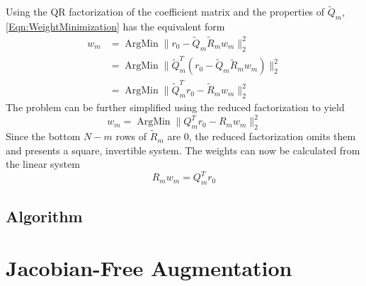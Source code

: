 \documentclass[Prelim,12pt]{WisconsinThesis}
\DeclareMathOperator*{\ArgMin}{ArgMin}
\begin{document}
Using the QR factorization of the coefficient matrix and the properties of $\widetilde{Q}_m$, \cref{Eqn:WeightMinimization} has the equivalent form
\begin{align*}
    w_m &= \ArgMin\|                   r_0 - \widetilde{Q}_m \widetilde{R}_m w_m \|_2^2 \\
        &= \ArgMin\|\widetilde{Q}^T_m (r_0 - \widetilde{Q}_m \widetilde{R}_m w_m)\|_2^2 \\
        &= \ArgMin\|\widetilde{Q}^T_m  r_0 -                 \widetilde{R}_m w_m \|_2^2
\end{align*}
The problem can be further simplified using the reduced factorization to yield
\begin{equation}
    w_m = 
        \ArgMin
            \|
                Q^T_m  r_0
                -
                R_m w_m
            \|_2^2
\end{equation}
Since the bottom $N-m$ rows of $\widetilde{R}_m$ are $0$, the reduced factorization omits them and presents a square, invertible system.
The weights can now be calculated from the linear system
\begin{equation}
    R_m w_m = Q^T_m  r_0
\end{equation}





\subsection{Algorithm}


\section{Jacobian-Free Augmentation}
\end{document}
